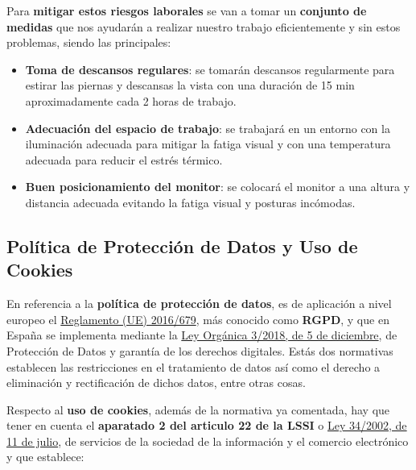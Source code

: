 Para \textbf{mitigar estos riesgos laborales} se van a tomar un \textbf{conjunto de medidas} que nos ayudarán a realizar nuestro trabajo eficientemente y sin estos problemas, siendo las principales:

\begin{itemize}
	\item \textbf{Toma de descansos regulares}: se tomarán descansos regularmente para estirar las piernas y descansas la vista con una duración de 15 min aproximadamente cada 2 horas de trabajo.
	\item \textbf{Adecuación del espacio de trabajo}: se trabajará en un entorno con la iluminación adecuada para mitigar la fatiga visual y con una temperatura adecuada para reducir el estrés térmico.
	\item \textbf{Buen posicionamiento del monitor}: se colocará el monitor a una altura y distancia adecuada evitando la fatiga visual y posturas incómodas.
\end{itemize} 

\subsection{Política de Protección de Datos y Uso de Cookies}
En referencia a la \textbf{política de protección de datos}, es de aplicación a nivel europeo el \href{https://www.boe.es/doue/2016/119/L00001-00088.pdf}{Reglamento (UE) 2016/679}, más conocido como \textbf{RGPD}, y que en España se implementa mediante la \href{https://www.boe.es/buscar/act.php?id=BOE-A-2018-16673}{Ley Orgánica 3/2018, de 5 de diciembre}, de Protección de Datos y garantía de los derechos digitales. Estás dos normativas establecen las restricciones en el tratamiento de datos así como el derecho a eliminación y rectificación de dichos datos, entre otras cosas.

Respecto al \textbf{uso de cookies}, además de la normativa ya comentada, hay que tener en cuenta el \textbf{aparatado 2 del articulo 22 de la LSSI} o \href{https://www.boe.es/buscar/act.php?id=BOE-A-2002-13758}{Ley 34/2002, de 11 de julio}, de servicios de la sociedad de la información y el comercio electrónico y que establece:

